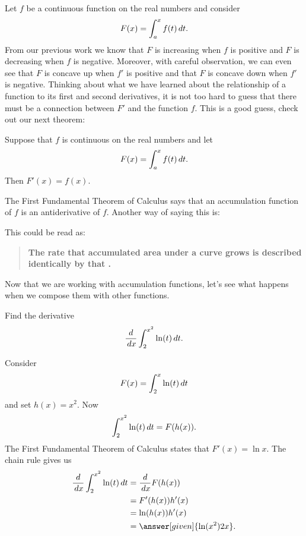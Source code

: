\documentclass{ximera}
\begin{document}
Let $f$ be a continuous function on the real numbers and consider
\[
  F(x) = \int_a^x f(t)\,d t.
\]
From our previous work we know that $F$ is increasing when $f$ is
positive and $F$ is decreasing when $f$ is negative. Moreover, with
careful observation, we can even see that $F$ is concave up when $f'$
is positive and that $F$ is concave down when $f'$ is negative.
Thinking about what we have learned about the relationship of a
function to its first and second derivatives, it is not too hard to
guess that there must be a connection between $F'$ and the function
$f$. This is a good guess, check out our next theorem:


\begin{theorem}
Suppose that $f$ is continuous on the real numbers and let
\[
  F(x)=\int_a^x f(t)\,d t.
\]
Then $F'(x)=f(x)$.
\end{theorem}
The First Fundamental Theorem of Calculus says that an accumulation
function of $f$ is an antiderivative of $f$. Another way of saying
this is:
\begin{image}
\end{image}
This could be read as:%
\begin{quote}\large\textbf{The \textcolor{blue!70!green}{rate} that \textcolor{green!70!black!70!blue}{accumulated area} under a  \textcolor{purple!50!blue!90!black}{curve} grows is described identically by that  \color{purple!50!blue!90!black}{curve}.}
\end{quote}

Now that we are working with accumulation functions, let's see what
happens when we compose them with other functions.

\begin{example}
  Find the derivative 
  \[
 \frac{d}{\,d x} \int_2^{x^2} \ln(t) \,d t.
  \]
  \begin{explanation}
    Consider 
    \[
    F(x) = \int_2^x \ln(t) \,d t
    \]
    and set $h(x) = x^2$. Now
    \[
    \int_2^{x^2} \ln(t) \,d t = F(h(x)).
    \]
    The First Fundamental Theorem of Calculus states that $F'(x) = \ln
    x$. The chain rule gives us
    \begin{align*}
       \ddx \int_2^{x^2} \ln(t) \d t&= \ddx F(h(x)) \\
       &= F' (h(x))h'(x) \\
      &= \ln (h(x)) h'(x) \\
      &= \answer[given]{\ln(x^2) 2x}.
    \end{align*}
  \end{explanation}
\end{example}
\end{document}
